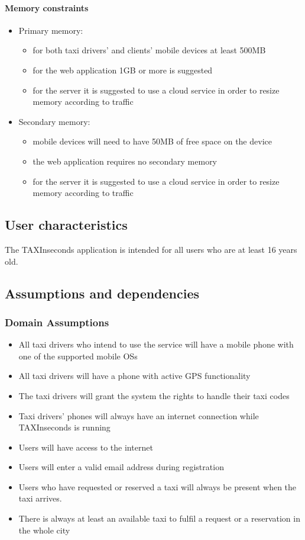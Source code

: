\documentclass{article}
\begin{document}
\paragraph{Memory constraints} 
\begin{itemize}
	\item Primary memory:
		\begin{itemize}
			\item for both taxi drivers' and clients' mobile devices at least 500MB 
			\item for the web application 1GB or more is suggested
			\item for the server it is suggested to use a cloud service in order to resize memory according to traffic
		\end{itemize}
	\item Secondary memory:
		\begin{itemize}
			\item mobile devices will need to have 50MB of free space on the device
			\item the web application requires no secondary memory 
			\item for the server it is suggested to use a cloud service in order to resize memory according to traffic
		\end{itemize}
\end{itemize}
\subsection{User characteristics}
The TAXInseconds application is intended for all users who are at least 16 years old. 
\subsection{Assumptions and dependencies}
\subsubsection{Domain Assumptions}
\begin{itemize}
	\item All taxi drivers who intend to use the service will have a mobile phone with one of the supported mobile OSs
	\item All taxi drivers will have a phone with active GPS functionality 
	\item The taxi drivers will grant the system the rights to handle their taxi codes
	\item Taxi drivers' phones will always have an internet connection while TAXInseconds is running
	\item Users will have access to the internet
	\item Users will enter a valid email address during registration 
	\item Users who have requested or reserved a taxi will always be present when the taxi arrives.
	\item There is always at least an available taxi to fulfil a request or a reservation in the whole city
\end{itemize}
\clearpage
\end{document}
